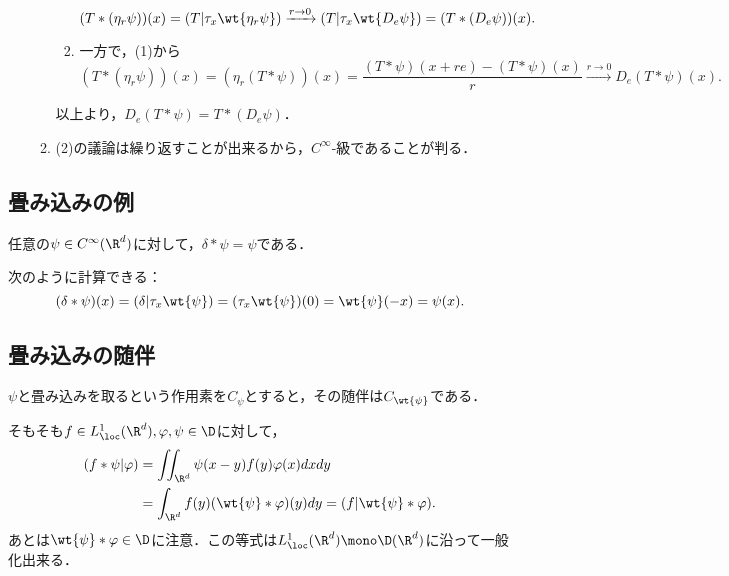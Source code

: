 \documentclass[uplatex,dvipdfmx]{jsreport}
\begin{document}
\begin{Proof}
\begin{enumerate}
\begin{enumerate}[{Step}1]
\begin{enumerate}
                \[(T*(\eta_r\psi))(x)=(T|\tau_x\wt{\eta_r\psi})\xrightarrow{r\to0}(T|\tau_x\wt{D_e\psi})=(T*(D_e\psi))(x).\]
                \item 一方で，(1)から
                \[(T*(\eta_r\psi))(x)=(\eta_r(T*\psi))(x)=\frac{(T*\psi)(x+re)-(T*\psi)(x)}{r}\xrightarrow{r\to0}D_e(T*\psi)(x).\]
            \end{enumerate}
            以上より，$D_e(T*\psi)=T*(D_e\psi)$．
            \item (2)の議論は繰り返すことが出来るから，$C^\infty$-級であることが判る．
        \end{enumerate}
    \end{enumerate}
\end{Proof}

\subsection{畳み込みの例}

\begin{proposition}[Delta分布が畳み込みの単位元である]
    任意の$\psi\in C^\infty(\R^d)$に対して，$\delta*\psi=\psi$である．
\end{proposition}
\begin{Proof}
    次のように計算できる：
    \[(\delta*\psi)(x)=(\delta|\tau_x\wt{\psi})=(\tau_x\wt{\psi})(0)=\wt{\psi}(-x)=\psi(x).\]
\end{Proof}

\subsection{畳み込みの随伴}

\begin{tcolorbox}[colframe=ForestGreen, colback=ForestGreen!10!white,breakable,colbacktitle=ForestGreen!40!white,coltitle=black,fonttitle=\bfseries\sffamily,
title=]
    $\psi$と畳み込みを取るという作用素を$C_\psi$とすると，その随伴は$C_{\wt{\psi}}$である．
\end{tcolorbox}

\begin{observation}[関数の畳み込みと内積]
    そもそも$f\in L^1_\loc(\R^d),\varphi,\psi\in\D$に対して，
    \begin{align*}
        (f*\psi|\varphi)&=\iint_{\R^d}\psi(x-y)f(y)\varphi(x)dxdy\\
        &=\int_{\R^d}f(y)(\wt{\psi}*\varphi)(y)dy=(f|\wt{\psi}*\varphi).
    \end{align*}
    あとは$\wt{\psi}*\varphi\in\D$に注意．この等式は$L^1_\loc(\R^d)\mono\D(\R^d)$に沿って一般化出来る．
\end{observation}
\end{document}
